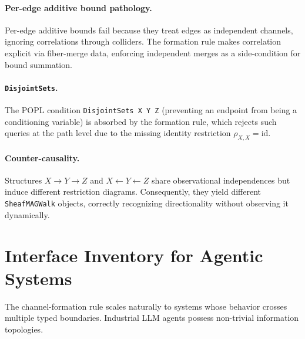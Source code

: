 \documentclass[acmsmall,screen,nonacm]{acmart}
\newcommand{\lean}[1]{\lstinline!#1!}
\begin{document}
\paragraph{Per-edge additive bound pathology.}
Per-edge additive bounds fail because they treat edges as independent channels, ignoring correlations through colliders. The formation rule makes correlation explicit via fiber-merge data, enforcing independent merges as a side-condition for bound summation.

\paragraph{\texttt{DisjointSets}.}
The POPL condition \lean{DisjointSets X Y Z} (preventing an endpoint from being a conditioning variable) is absorbed by the formation rule, which rejects such queries at the path level due to the missing identity restriction $\rho_{X,X} = \text{id}$.

\paragraph{Counter-causality.}
Structures $X \to Y \to Z$ and $X \leftarrow Y \leftarrow Z$ share observational independences but induce different restriction diagrams. Consequently, they yield different \lean{SheafMAGWalk} objects, correctly recognizing directionality without observing it dynamically.

\section{Interface Inventory for Agentic Systems}\label{sec:inventory}
The channel-formation rule scales naturally to systems whose behavior crosses multiple typed boundaries. Industrial LLM agents possess non-trivial information topologies.
\end{document}
